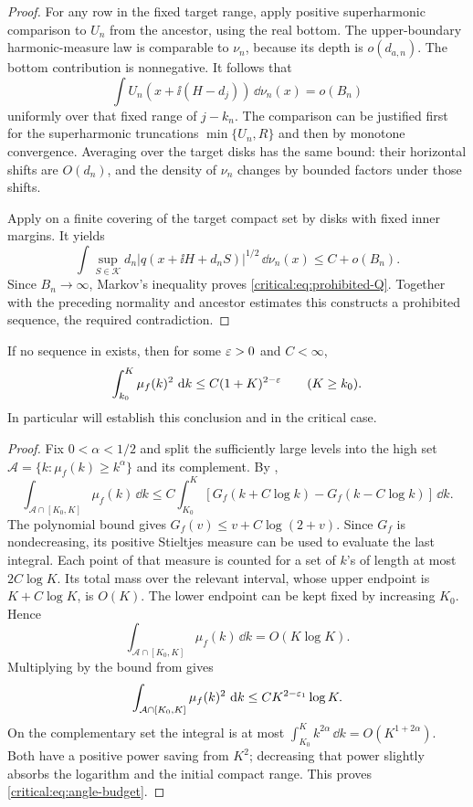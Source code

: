 \begin{proof}
For any row in the fixed target range, apply positive
superharmonic comparison to \(U_n\) from the ancestor, using the
real bottom. The upper-boundary harmonic-measure law is comparable
to \(\nu_n\), because its depth is \(o(d_{a,n})\). The bottom
contribution is nonnegative. It follows that
\[
 \int U_n(x+\ii(H-d_j))\,\dd\nu_n(x)=o(B_n)
\]
uniformly over that fixed range of \(j-k_n\). The comparison can
be justified first for the superharmonic truncations
\(\min\{U_n,R\}\) and then by monotone convergence. Averaging
over the target disks has the same bound: their horizontal shifts
are \(O(d_n)\), and the density of \(\nu_n\) changes by bounded
factors under those shifts.

Apply  on a finite covering of the target
compact set by disks with fixed inner margins. It yields
\[
 \int \sup_{S\in\mathcal K}
          d_n|q(x+\ii H+d_nS)|^{1/2}\,\dd\nu_n(x)
 \le C+o(B_n).
\]
Since \(B_n\to\infty\), Markov's inequality proves
\eqref{critical:eq:prohibited-Q}. Together with the preceding
normality and ancestor estimates this constructs a prohibited
sequence, the required contradiction.
\end{proof}

\begin{theorem}\label{thm:angle-budget-reduction}
If no sequence in  exists, then for
some \(\varepsilon>0\) and \(C<\infty\),
\begin{equation}\label{critical:eq:angle-budget}
 \int_{k_0}^K\mu_f(k)^2\,\,\mathrm d k\le C(1+K)^{2-\varepsilon}
 \qquad(K\ge k_0).
\end{equation}
In particular  will establish this
conclusion and  in the critical
case.
\end{theorem}

\begin{proof}
Fix \(0<\alpha<1/2\) and split the sufficiently large levels into
the high set \(\mathcal A=\{k:\mu_f(k)\ge k^\alpha\}\) and its
complement. By ,
\[
 \int_{\mathcal A\cap[K_0,K]}\mu_f(k)\,\dd k
 \le C\int_{K_0}^K
       [G_f(k+C\log k)-G_f(k-C\log k)]\,\dd k.
\]
The polynomial bound gives \(G_f(v)\le v+C\log(2+v)\).
Since \(G_f\) is nondecreasing, its positive Stieltjes measure can
be used to evaluate the last integral. Each point of that measure
is counted for a set of \(k\)'s of length at most \(2C\log K\).
Its total mass over the relevant interval, whose upper endpoint is
\(K+C\log K\), is \(O(K)\). The lower endpoint can be kept
fixed by increasing \(K_0\). Hence
\[
 \int_{\mathcal A\cap[K_0,K]}\mu_f(k)\,\dd k=O(K\log K).
\]
Multiplying by the bound from
 gives
\[
 \int_{\mathcal A\cap[K_0,K]}\mu_f(k)^2\,\,\mathrm d k
 \le C K^{2-\varepsilon_1}\log K.
\]
On the complementary set the integral is at most
\(\int_{K_0}^K k^{2\alpha}\,\dd k=O(K^{1+2\alpha})\).
Both have a positive power saving from \(K^2\); decreasing that
power slightly absorbs the logarithm and the initial compact range.
This proves \eqref{critical:eq:angle-budget}.
\end{proof}
